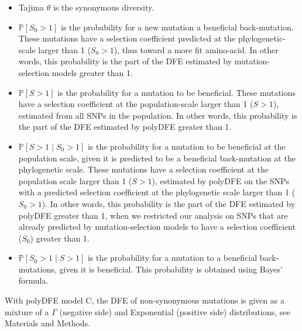 \documentclass{article}
\newcommand{\Sphy}{S_{0}}
\newcommand{\given}{\mid}
\newcommand{\Spop}{S}
\begin{document}
    \begin{itemize}
        \item Tajima $\theta$ is the synonymous diversity.
        \item $\mathbb{P} [ \Sphy > 1 ]$ is the probability for a new mutation a beneficial back-mutation.
        These mutations have a selection coefficient predicted at the phylogenetic-scale larger than 1 ($\Sphy > 1$), thus toward a more fit amino-acid.
        In other words, this probability is the part of the DFE estimated by mutation-selection models greater than 1.
        \item $\mathbb{P} [ \Spop > 1 ]$ is the probability for a mutation to be beneficial.
        These mutations have a selection coefficient at the population-scale larger than 1 ($\Spop > 1$), estimated from all SNPs in the population.
        In other words, this probability is the part of the DFE estimated by polyDFE greater than 1.
        \item $\mathbb{P} [ \Spop > 1 \given \Sphy > 1]$ is the probability for a mutation to be beneficial at the population scale, given it is predicted to be a beneficial back-mutation at the phylogenetic scale.
        These mutations have a selection coefficient at the population scale larger than 1 ($\Spop > 1$), estimated by polyDFE on the SNPs with a predicted selection coefficient at the phylogenetic scale larger than 1 ($\Sphy > 1$).
        In other words, this probability is the part of the DFE estimated by polyDFE greater than 1, when we restricted our analysis on SNPs that are already predicted by mutation-selection models to have a selection coefficient ($\Sphy$) greater than 1.
        \item $\mathbb{P} [ \Sphy > 1 \given \Spop > 1]$ is the probability for a mutation to a beneficial back-mutations, given it is beneficial.
        This probability is obtained using Bayes' formula.
    \end{itemize}
    With polyDFE model C, the DFE of non-synonymous mutations is given as a mixture of a $\Gamma$ (negative side) and Exponential (positive side) distributions, see Materials and Methods.
\end{document}
